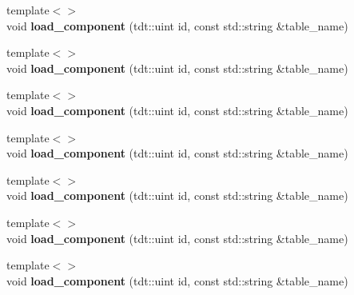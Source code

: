 \begin{DoxyCompactItemize}
\item 
{\footnotesize template$<$$>$ }\\void {\bfseries load\+\_\+component} (tdt\+::uint id, const std\+::string \&table\+\_\+name)\hypertarget{class_entity_system_ac8eead7736efd2ae728661f901142b27}{}\label{class_entity_system_ac8eead7736efd2ae728661f901142b27}

\item 
{\footnotesize template$<$$>$ }\\void {\bfseries load\+\_\+component} (tdt\+::uint id, const std\+::string \&table\+\_\+name)\hypertarget{class_entity_system_ac8eead7736efd2ae728661f901142b27}{}\label{class_entity_system_ac8eead7736efd2ae728661f901142b27}

\item 
{\footnotesize template$<$$>$ }\\void {\bfseries load\+\_\+component} (tdt\+::uint id, const std\+::string \&table\+\_\+name)\hypertarget{class_entity_system_ac8eead7736efd2ae728661f901142b27}{}\label{class_entity_system_ac8eead7736efd2ae728661f901142b27}

\item 
{\footnotesize template$<$$>$ }\\void {\bfseries load\+\_\+component} (tdt\+::uint id, const std\+::string \&table\+\_\+name)\hypertarget{class_entity_system_ac8eead7736efd2ae728661f901142b27}{}\label{class_entity_system_ac8eead7736efd2ae728661f901142b27}

\item 
{\footnotesize template$<$$>$ }\\void {\bfseries load\+\_\+component} (tdt\+::uint id, const std\+::string \&table\+\_\+name)\hypertarget{class_entity_system_ac8eead7736efd2ae728661f901142b27}{}\label{class_entity_system_ac8eead7736efd2ae728661f901142b27}

\item 
{\footnotesize template$<$$>$ }\\void {\bfseries load\+\_\+component} (tdt\+::uint id, const std\+::string \&table\+\_\+name)\hypertarget{class_entity_system_ac8eead7736efd2ae728661f901142b27}{}\label{class_entity_system_ac8eead7736efd2ae728661f901142b27}

\item 
{\footnotesize template$<$$>$ }\\void {\bfseries load\+\_\+component} (tdt\+::uint id, const std\+::string \&table\+\_\+name)\hypertarget{class_entity_system_ac8eead7736efd2ae728661f901142b27}{}\label{class_entity_system_ac8eead7736efd2ae728661f901142b27}


\end{DoxyCompactItemize}
